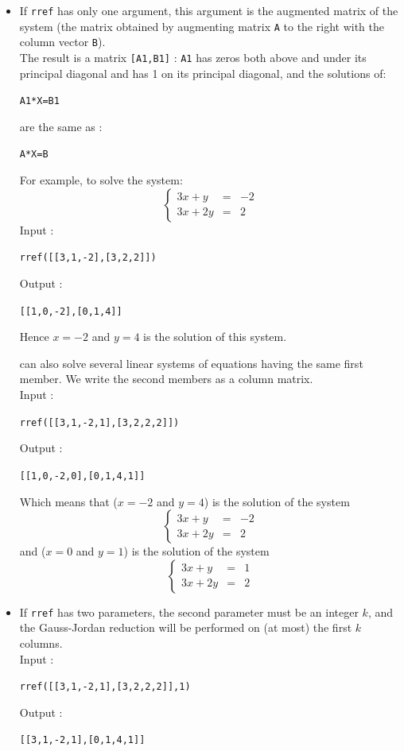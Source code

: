 \documentclass[a4paper,11pt]{book}
\begin{document}
\begin{itemize}
\item
If {\tt rref}  has only one argument, this argument is the augmented matrix 
of the system (the matrix obtained by augmenting matrix {\tt A} to the 
right with the column vector {\tt B}).\\
The result is a matrix {\tt [A1,B1]} : {\tt A1} has zeros both above and under 
its principal diagonal and has 1 on its principal diagonal, and the solutions 
of:
\begin{center}{\tt A1*X=B1}\end{center} 
are the same as :
\begin{center}{\tt A*X=B}\end{center}
For example, to solve the system:
\[
\left \{
\begin{array}{lcr} 3x + y & = &-2 \\3x +2y & =& 2 \end{array}\right.
\] 
Input :
\begin{center}{\tt rref([[3,1,-2],[3,2,2]])}\end{center}
Output :
\begin{center}{\tt [[1,0,-2],[0,1,4]]}\end{center}
Hence $x=-2$ and $y=4$ is the solution of this system.

 can also solve several linear systems
of equations having the same first member.
We write the second members as a column matrix.\\ 
Input  :
\begin{center}{\tt rref([[3,1,-2,1],[3,2,2,2]])}\end{center}
Output  :
\begin{center}{\tt [[1,0,-2,0],[0,1,4,1]]}\end{center}
Which means that ($x=-2$ and $y=4$) is the solution of the system
$$\left \{
\begin{array}{lcr} 3x + y & = &-2 \\3x +2y & =& 2 \end{array}\right.$$
and ($x=0$ and $y=1$) is the solution of the system
$$\left \{
\begin{array}{lcr} 3x + y & = &1 \\3x +2y & =& 2 \end{array}\right.$$
\item
If {\tt rref}  has two parameters, the second parameter must be an integer 
$k$, and the Gauss-Jordan reduction will be performed on (at most)
the first $k$ columns.\\
Input  :
\begin{center}{\tt rref([[3,1,-2,1],[3,2,2,2]],1)}\end{center}
Output  :
\begin{center}{\tt [[3,1,-2,1],[0,1,4,1]]}\end{center}
\end{itemize}
\end{document}
